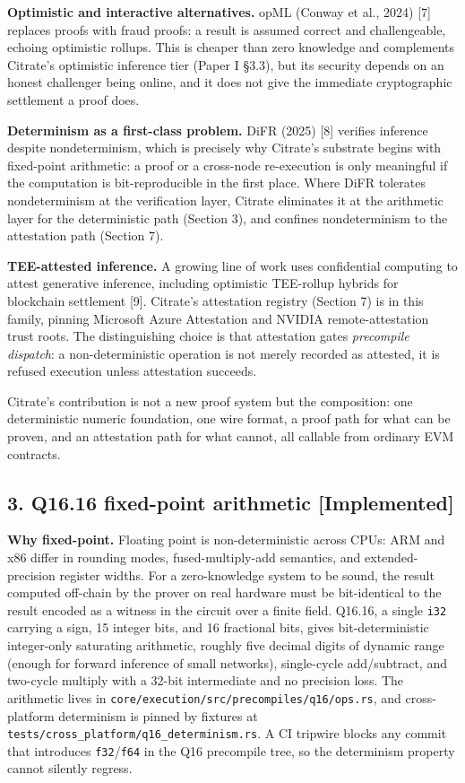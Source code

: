 \textbf{Optimistic and interactive alternatives.} opML (Conway et al.,
2024) {[}7{]} replaces proofs with fraud proofs: a result is assumed
correct and challengeable, echoing optimistic rollups. This is cheaper
than zero knowledge and complements Citrate's optimistic inference tier
(Paper I §3.3), but its security depends on an honest challenger being
online, and it does not give the immediate cryptographic settlement a
proof does.

\textbf{Determinism as a first-class problem.} DiFR (2025) {[}8{]}
verifies inference despite nondeterminism, which is precisely why
Citrate's substrate begins with fixed-point arithmetic: a proof or a
cross-node re-execution is only meaningful if the computation is
bit-reproducible in the first place. Where DiFR tolerates nondeterminism
at the verification layer, Citrate eliminates it at the arithmetic layer
for the deterministic path (Section 3), and confines nondeterminism to
the attestation path (Section 7).

\textbf{TEE-attested inference.} A growing line of work uses
confidential computing to attest generative inference, including
optimistic TEE-rollup hybrids for blockchain settlement {[}9{]}.
Citrate's attestation registry (Section 7) is in this family, pinning
Microsoft Azure Attestation and NVIDIA remote-attestation trust roots.
The distinguishing choice is that attestation gates \emph{precompile
dispatch}: a non-deterministic operation is not merely recorded as
attested, it is refused execution unless attestation succeeds.

Citrate's contribution is not a new proof system but the composition:
one deterministic numeric foundation, one wire format, a proof path for
what can be proven, and an attestation path for what cannot, all
callable from ordinary EVM contracts.

\subsection{3. Q16.16 fixed-point arithmetic
{[}Implemented{]}}\label{q16.16-fixed-point-arithmetic-implemented}

\textbf{Why fixed-point.} Floating point is non-deterministic across
CPUs: ARM and x86 differ in rounding modes, fused-multiply-add
semantics, and extended-precision register widths. For a zero-knowledge
system to be sound, the result computed off-chain by the prover on real
hardware must be bit-identical to the result encoded as a witness in the
circuit over a finite field. Q16.16, a single \texttt{i32} carrying a
sign, 15 integer bits, and 16 fractional bits, gives bit-deterministic
integer-only saturating arithmetic, roughly five decimal digits of
dynamic range (enough for forward inference of small networks),
single-cycle add/subtract, and two-cycle multiply with a 32-bit
intermediate and no precision loss. The arithmetic lives in
\texttt{core/execution/src/precompiles/q16/ops.rs}, and cross-platform
determinism is pinned by fixtures at
\texttt{tests/cross\_platform/q16\_determinism.rs}. A CI tripwire blocks
any commit that introduces \texttt{f32}/\texttt{f64} in the Q16
precompile tree, so the determinism property cannot silently regress.

